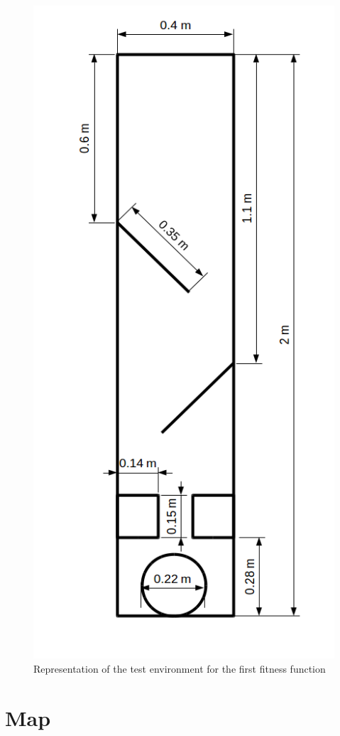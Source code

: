\begin{figure}[h]
\centering
\includegraphics[scale=0.6]{Chapter3/images/first_fitness_environment.png}
\caption{Representation of the test environment for the first fitness function}
\label{appendixb:first_fitness}
\end{figure}

\section{Map}

